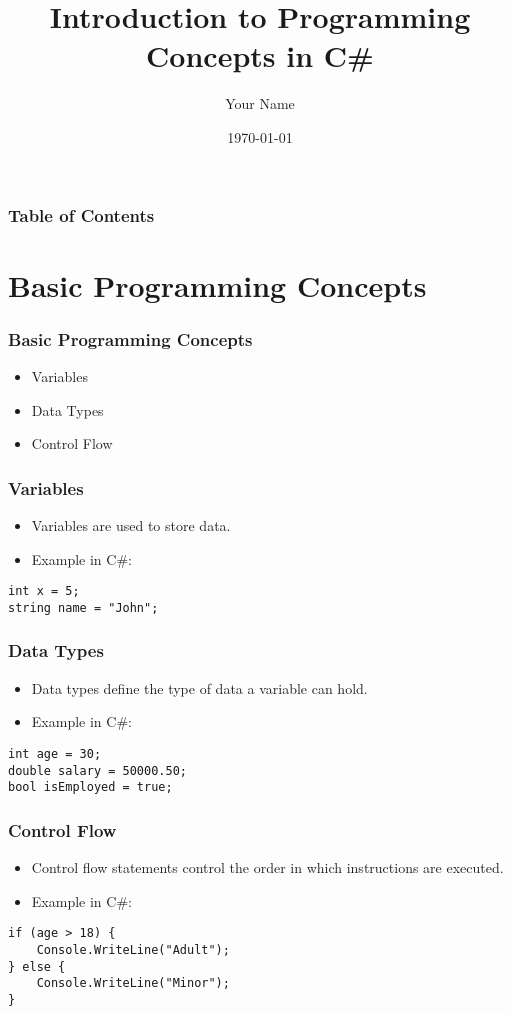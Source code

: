 \documentclass{beamer}
\title{Introduction to Programming Concepts in C\#}
\author{Your Name}
\date{\today}
\begin{document}
\frame{\titlepage}

\begin{frame}
\frametitle{Table of Contents}
\tableofcontents
\end{frame}

\section{Basic Programming Concepts}
\begin{frame}
\frametitle{Basic Programming Concepts}
\begin{itemize}
    \item Variables
    \item Data Types
    \item Control Flow
\end{itemize}
\end{frame}

\begin{frame}[fragile]
\frametitle{Variables}
\begin{itemize}
    \item Variables are used to store data.
    \item Example in C\#:
\end{itemize}
\begin{verbatim}
int x = 5;
string name = "John";
\end{verbatim}
\end{frame}

\begin{frame}[fragile]
\frametitle{Data Types}
\begin{itemize}
    \item Data types define the type of data a variable can hold.
    \item Example in C\#:
\end{itemize}
\begin{verbatim}
int age = 30;
double salary = 50000.50;
bool isEmployed = true;
\end{verbatim}
\end{frame}

\begin{frame}[fragile]
\frametitle{Control Flow}
\begin{itemize}
    \item Control flow statements control the order in which instructions are executed.
    \item Example in C\#:
\end{itemize}
\begin{verbatim}
if (age > 18) {
    Console.WriteLine("Adult");
} else {
    Console.WriteLine("Minor");
}
\end{verbatim}
\end{frame}
\end{document}
